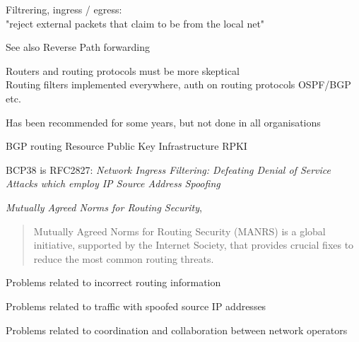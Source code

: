 \documentclass[Screen16to9,17pt]{foils}
\begin{document}
\begin{list2}
\item Filtrering, ingress / egress:\\
"reject external packets that claim to be from the local net"
\item See also Reverse Path forwarding 
\item Routers and routing protocols must be more skeptical\\
Routing filters implemented everywhere, auth on routing protocols OSPF/BGP etc.
\item Has been recommended for some years, but not done in all organisations
\item BGP routing Resource Public Key Infrastructure RPKI
\item BCP38 is RFC2827: \emph{Network Ingress Filtering: Defeating Denial of Service Attacks which employ IP Source Address Spoofing}\\
\item \emph{Mutually Agreed Norms for Routing Security}, 
\end{list2}




\begin{quote}
  Mutually Agreed Norms for Routing Security (MANRS) is a global initiative, supported by the Internet Society, that provides crucial fixes to reduce the most common routing threats. ﻿
\end{quote}

\begin{list1}
\item Problems related to incorrect routing information
\item Problems related to traffic with spoofed source IP addresses
\item Problems related to coordination and collaboration between network operators
\item {\small{}}
\item {\small{}}
\end{list1}

\end{document}
